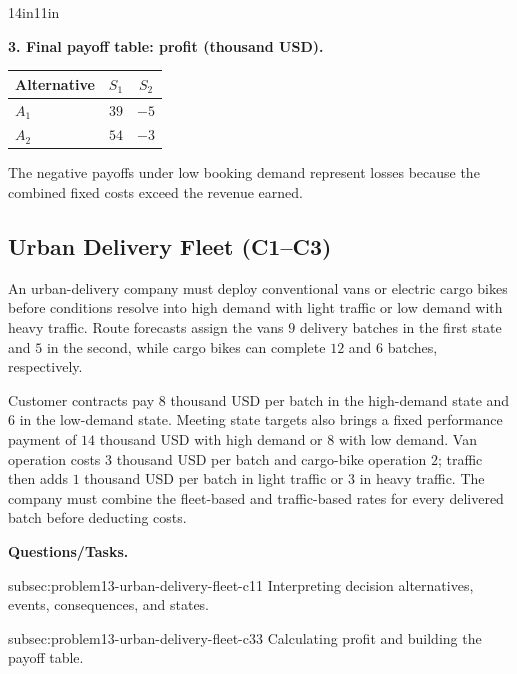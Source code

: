 \begin{CalculationLandscape}{14in}{11in}
\noindent\begin{minipage}{\linewidth}
\textbf{3. Final payoff table: profit (thousand USD).}
\begin{center}
\begin{tabular}{@{}lcc@{}}
\toprule
Alternative & \(S_1\) & \(S_2\) \\
\midrule
\(A_1\) & \(39\) & \(-5\) \\
\(A_2\) & \(54\) & \(-3\) \\
\bottomrule
\end{tabular}
\end{center}
\end{minipage}


	The negative payoffs under low booking demand represent losses because the
	combined fixed costs exceed the revenue earned.


\end{CalculationLandscape}


	\subsection{Urban Delivery Fleet (C1--C3)}
	\label{sec:problem13-urban-delivery-fleet-c1-c3}

	An urban-delivery company must deploy conventional vans or electric cargo bikes before conditions resolve into high demand with light traffic or low demand with heavy traffic. Route forecasts assign the vans \(9\) delivery batches in the first state and \(5\) in the second, while cargo bikes can complete \(12\) and \(6\) batches, respectively.

	Customer contracts pay \(8\) thousand USD per batch in the high-demand state and \(6\) in the low-demand state. Meeting state targets also brings a fixed performance payment of \(14\) thousand USD with high demand or \(8\) with low demand. Van operation costs \(3\) thousand USD per batch and cargo-bike operation \(2\); traffic then adds \(1\) thousand USD per batch in light traffic or \(3\) in heavy traffic. The company must combine the fleet-based and traffic-based rates for every delivered batch before deducting costs.

	\textbf{Questions/Tasks.}
	\begin{enumerate}
		\CriterionTask
		{subsec:problem13-urban-delivery-fleet-c1}{1}
		{Interpreting decision alternatives, events, consequences, and states.}

		\CriterionTask
		{subsec:problem13-urban-delivery-fleet-c3}{3}
		{Calculating profit and building the payoff table.}
	\end{enumerate}

